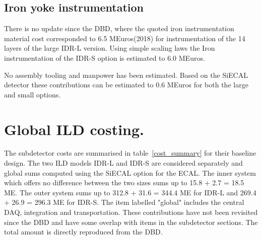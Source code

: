 \subsection{Iron yoke instrumentation}
There is no update since the DBD, where the quoted iron instrumentation material cost corresponded to 6.5 MEuros(2018) for instrumentation of the 14 layers of the large IDR-L version. Using simple scaling laws the Iron instrumentation of the IDR-S option is estimated to 6.0 MEuros.


No assembly tooling and manpower has been estimated. Based on the SiECAL detector these contributions can be estimated to 0.6 MEuros for both the large and small options. 

\section{Global ILD costing.}
The subdetector costs are summarised in table~\ref{cost_summary} for their baseline design. The two ILD models IDR-L and IDR-S are considered separately and global sums computed using the SiECAL option for the ECAL.
The inner system which offers no difference between the two sizes sums up to 15.8 + 2.7 = 18.5 ME. The outer system sums up to 312.8 + 31.6 = 344.4 ME for IDR-L and 269.4 + 26.9 = 296.3 ME for IDR-S.
The item labelled "global" includes the central DAQ, integration and transportation. These contributions have not been revisited since the DBD and have some overlap with items in the subdetector sections. The total amount is directly reproduced from the DBD.

